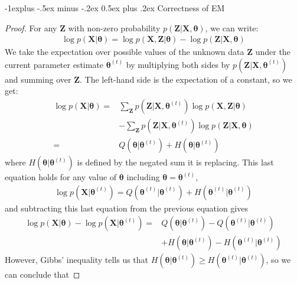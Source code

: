 \documentclass[10pt,landscape]{article}
\makeatletter
\renewcommand{\subsection}{\@startsection{subsection}{2}{0mm}%
                                {-1explus -.5ex minus -.2ex}%
                                {0.5ex plus .2ex}%
                                {\normalfont\small\bfseries}}
\makeatother
\begin{document}
\begin{multicols}{3}
\subsection{Correctness of EM}
\begin{proof}
	For any $\mathbf{Z}$ with non-zero probability $p(\mathbf{Z}|\mathbf{X}, \boldsymbol\theta)$, we can write:
	\begin{align*}
		\log p(\mathbf{X}|\boldsymbol\theta) = \log p(\mathbf{X}, \mathbf{Z}|\boldsymbol\theta) - \log p(\mathbf{Z}|\mathbf{X}, \boldsymbol\theta)
	\end{align*}
	We take the expectation over possible values of the unknown data $\mathbf{Z}$ under the current parameter estimate $\boldsymbol\theta^{(t)}$ by multiplying both sides by $p(\mathbf{Z}|\mathbf{X},\boldsymbol\theta^{(t)})$ and summing over $\mathbf{Z}$. The left-hand side is the expectation of a constant, so we get:
	\begin{align*}
		 \log p(\mathbf{X}|\boldsymbol\theta) = &\sum_{\mathbf{Z}} p(\mathbf{Z}|\mathbf{X}, \boldsymbol\theta^{(t)}) \log p(\mathbf{X}, \mathbf{Z}|\boldsymbol\theta)\\
		 &- \sum_{\mathbf{Z}} p(\mathbf{Z}|\mathbf{X}, \boldsymbol\theta^{(t)}) \log p(\mathbf{Z}|\mathbf{X}, \boldsymbol\theta)\\
		 = &Q(\boldsymbol\theta | \boldsymbol\theta^{(t)}) + H(\boldsymbol\theta | \boldsymbol\theta^{(t)})
	\end{align*}
	where $H(\boldsymbol\theta|\boldsymbol\theta^{(t)})$ is defined by the negated sum it is replacing. This last equation holds for any value of $\boldsymbol\theta$ including $\boldsymbol\theta = \boldsymbol\theta^{(t)}$,
	\begin{align*}
		\log p(\mathbf{X}|\boldsymbol\theta^{(t)})
		= Q(\boldsymbol\theta^{(t)}|\boldsymbol\theta^{(t)}) + H(\boldsymbol\theta^{(t)}|\boldsymbol\theta^{(t)})
	\end{align*}
	and subtracting this last equation from the previous equation gives
	\begin{align*}
		\log p(\mathbf{X}|\boldsymbol\theta) - \log p(\mathbf{X}|\boldsymbol\theta^{(t)})
		= &Q(\boldsymbol\theta|\boldsymbol\theta^{(t)}) - Q(\boldsymbol\theta^{(t)}|\boldsymbol\theta^{(t)})\\
		&+ H(\boldsymbol\theta|\boldsymbol\theta^{(t)}) - H(\boldsymbol\theta^{(t)}|\boldsymbol\theta^{(t)})
	\end{align*}
	However, Gibbs' inequality tells us that $H(\boldsymbol\theta|\boldsymbol\theta^{(t)}) \ge H(\boldsymbol\theta^{(t)}|\boldsymbol\theta^{(t)})$, so we can conclude that

\end{proof}
\end{multicols}
\end{document}
